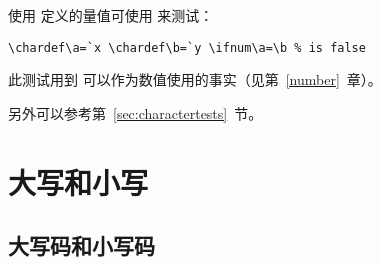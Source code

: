 \documentclass{book}
\begin{document}
使用  定义的量值可使用  来测试：
\begin{verbatim}
\chardef\a=`x \chardef\b=`y \ifnum\a=\b % is false
\end{verbatim}
此测试用到  可以作为数值使用的事实（见第~\ref{number}~章）。

另外可以参考第~\ref{sec:charactertests}~节。


\section{大写和小写}

\subsection{大写码和小写码}
\label{uc/lc}
\end{document}
